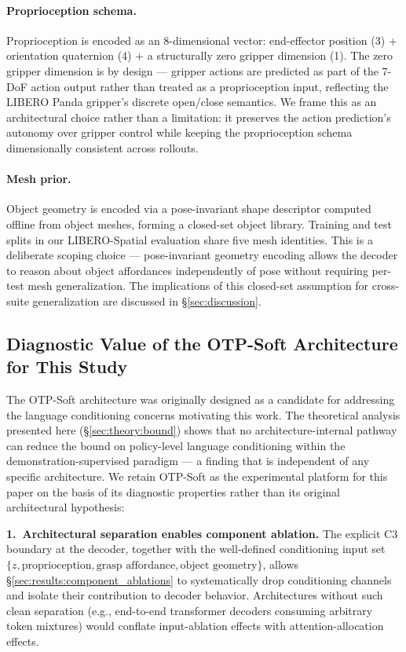 \paragraph{Proprioception schema.}
Proprioception is encoded as an 8-dimensional vector: end-effector position (3) +
orientation quaternion (4) + a structurally zero gripper dimension (1). The zero gripper
dimension is by design --- gripper actions are predicted as part of the 7-DoF action
output rather than treated as a proprioception input, reflecting the LIBERO Panda
gripper's discrete open/close semantics. We frame this as an architectural choice rather
than a limitation: it preserves the action prediction's autonomy over gripper control
while keeping the proprioception schema dimensionally consistent across rollouts.

\paragraph{Mesh prior.}
Object geometry is encoded via a pose-invariant shape descriptor computed offline from
object meshes, forming a closed-set object library. Training and test splits in our
LIBERO-Spatial evaluation share five mesh identities. This is a deliberate scoping
choice --- pose-invariant geometry encoding allows the decoder to reason about object
affordances independently of pose without requiring per-test mesh generalization. The
implications of this closed-set assumption for cross-suite generalization are discussed in
\S\ref{sec:discussion}.

\subsection{Diagnostic Value of the OTP-Soft Architecture for This Study}
\label{sec:architecture:falsification}

The OTP-Soft architecture was originally designed as a candidate for addressing the
language conditioning concerns motivating this work. The theoretical analysis presented
here (\S\ref{sec:theory:bound}) shows that no architecture-internal pathway can reduce the
bound on policy-level language conditioning within the demonstration-supervised paradigm
--- a finding that is independent of any specific architecture. We retain OTP-Soft as the
experimental platform for this paper on the basis of its diagnostic properties rather
than its original architectural hypothesis:

\textbf{1.~Architectural separation enables component ablation.} The explicit C3 boundary
at the decoder, together with the well-defined conditioning input set $\{z,
\text{proprioception}, \text{grasp affordance}, \text{object geometry}\}$, allows
\S\ref{sec:results:component_ablations} to systematically drop conditioning channels and
isolate their contribution to decoder behavior. Architectures without such clean separation
(e.g., end-to-end transformer decoders consuming arbitrary token mixtures) would conflate
input-ablation effects with attention-allocation effects.

